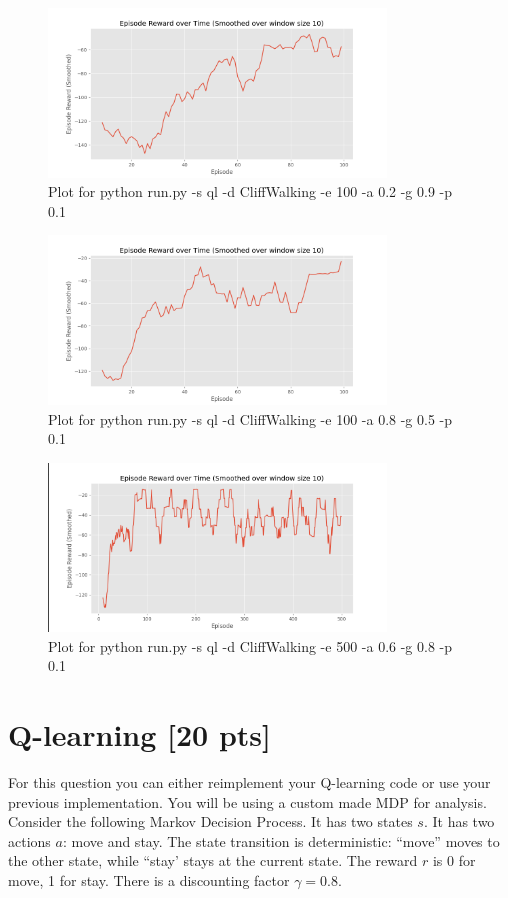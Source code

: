 \documentclass[a4paper]{article}
\theoremstyle{definition}
\newenvironment{soln}{
    \leavevmode\color{blue}\ignorespaces
}{}
\begin{document}
\begin{soln}
    \begin{figure}[H]
        \centering
        \includegraphics[width=0.8\textwidth]{images/3.1.png}
        \caption{Plot for python run.py -s ql -d CliffWalking -e 100 -a 0.2 -g 0.9 -p 0.1}
    \end{figure}
    \begin{figure}[H]
        \centering
        \includegraphics[width=0.8\textwidth]{images/3.2.png}
        \caption{Plot for python run.py -s ql -d CliffWalking -e 100 -a 0.8 -g 0.5 -p 0.1}
    \end{figure}
    \begin{figure}[H]
        \centering
        \includegraphics[width=0.8\textwidth]{images/3.3.png}
        \caption{Plot for python run.py -s ql -d CliffWalking -e 500 -a 0.6 -g 0.8 -p 0.1}
    \end{figure}
\end{soln}


\section{Q-learning [20 pts]}
For this question you can either reimplement your Q-learning code or use your previous implementation. You will be using a custom made MDP for analysis. Consider the following Markov Decision Process.
It has two states $s$. It has two actions $a$: move and stay. The state transition is deterministic: ``move'' moves to the other state, while ``stay' stays at the current state. The reward $r$ is 0 for move,  1 for stay. There is a discounting factor $\gamma=0.8$.
\\
\end{document}

